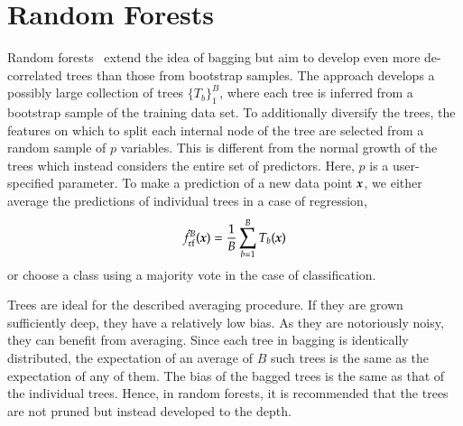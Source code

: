 \begin{refsection}
\begin{example}
\end{example}

\section{Random Forests}

Random forests~\citep{Brieman2001} extend the idea of bagging but aim to develop even more de-correlated trees than those from bootstrap samples. The approach develops a possibly large collection of trees $\{T_b\}_1^B$, where each tree is inferred from a bootstrap sample of the training data set. To additionally diversify the trees, the features on which to split each internal node of the tree are selected from a random sample of $p$ variables. This is different from the normal growth of the trees which instead considers the entire set of predictors. Here, $p$ is a user-specified parameter. To make a prediction of a new data point $\boldsymbol{x}$, we either average the predictions of individual trees in a case of regression,
$$ \hat{f}_{\rm rf}^B(\boldsymbol{x})={1\over B}\sum_{b=1}^B T_b({\boldsymbol{x}}) $$
or choose a class using a majority vote in the case of classification.

Trees are ideal for the described averaging procedure. If they are grown sufficiently deep, they have a relatively low bias. As they are notoriously noisy, they can benefit from averaging. Since each tree in bagging is identically distributed, the expectation of an average of $B$ such trees is the same as the expectation of any of them. The bias of the bagged trees is the same as that of the individual trees. Hence, in random forests, it is recommended that the trees are not pruned but instead developed to the depth.


\end{refsection}
